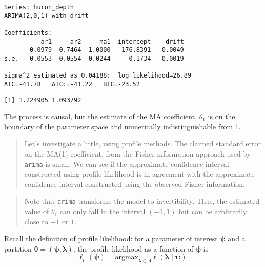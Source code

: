 \documentclass[]{book}
\newenvironment{Shaded}{\begin{snugshade}}{\end{snugshade}}
\newcommand{\CommentTok}[1]{\textcolor[rgb]{0.56,0.35,0.01}{\textit{#1}}}
\newcommand{\DecValTok}[1]{\textcolor[rgb]{0.00,0.00,0.81}{#1}}
\newcommand{\KeywordTok}[1]{\textcolor[rgb]{0.13,0.29,0.53}{\textbf{#1}}}
\newcommand{\NormalTok}[1]{#1}
\newcommand{\OperatorTok}[1]{\textcolor[rgb]{0.81,0.36,0.00}{\textbf{#1}}}
\newcommand{\StringTok}[1]{\textcolor[rgb]{0.31,0.60,0.02}{#1}}
\begin{document}
\begin{verbatim}
Series: huron_depth 
ARIMA(2,0,1) with drift 

Coefficients:
          ar1     ar2     ma1  intercept    drift
      -0.0979  0.7464  1.0000   176.8391  -0.0049
s.e.   0.0553  0.0554  0.0244     0.1734   0.0019

sigma^2 estimated as 0.04188:  log likelihood=26.89
AIC=-41.78   AICc=-41.22   BIC=-23.52
\end{verbatim}

\begin{Shaded}
\end{Shaded}

\begin{verbatim}
[1] 1.224905 1.093792
\end{verbatim}

The process is causal, but the estimate of the MA coefficient,
\(\theta_1\) is on the boundary of the parameter space and numerically
indistinguishable from 1.

\begin{quote}
Let's investigate a little, using profile methods. The claimed standard
error on the MA(1) coefficient, from the Fisher information approach
used by \texttt{arima} is small. We can see if the approximate
confidence interval constructed using profile likelihood is in agreement
with the approximate confidence interval constructed using the observed
Fisher information.
\end{quote}

\begin{quote}
Note that \texttt{arima} transforms the model to invertibility. Thus,
the estimated value of \(\theta_1\) can only fall in the interval
\((−1, 1)\) but can be arbitrarily close to \(−1\) or \(1\).
\end{quote}

Recall the definition of profile likelihood: for a parameter of interest
\(\boldsymbol{\psi}\) and a partition
\(\boldsymbol{\theta}=(\boldsymbol{\psi}, \boldsymbol{\lambda})\), the
profile likelihood as a function of \(\boldsymbol{\psi}\) is
\[\ell_p(\boldsymbol{\psi}) = \mathrm{argmax}_{\boldsymbol{\lambda} \in \Lambda} \ell(\boldsymbol{\lambda} \mid \boldsymbol{\psi}).\]
\end{document}
